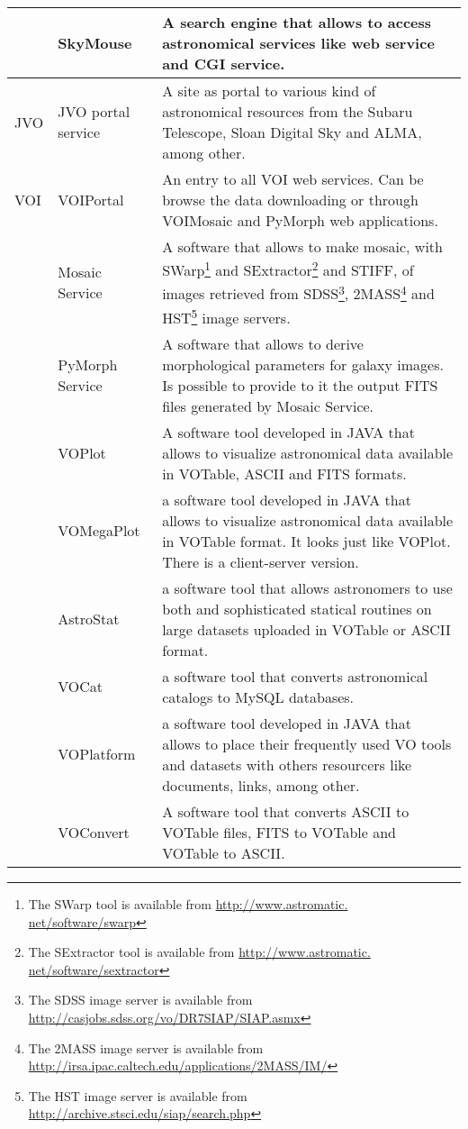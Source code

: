 \begin{table*}[h!t]
\begin{tabular}{|l|l|p{12.5cm}|}
			& SkyMouse & A search engine that allows to access astronomical services like web service and CGI service. \\
	\hline		
	JVO		& JVO portal service & A site as portal to various kind of astronomical resources from the Subaru Telescope, Sloan Digital Sky and ALMA, among 
									other. \\
	\hline								
	VOI		& VOIPortal & An entry to all VOI web services. Can be browse the data downloading or through VOIMosaic and PyMorph web applications.\\
			& Mosaic Service & A software that allows to make mosaic, with SWarp\footnote{The SWarp tool is available from \url{http://www.astromatic.
									net/software/swarp}} and SExtractor\footnote{The SExtractor tool is available from \url{http://www.astromatic.
									net/software/sextractor}} and STIFF, of images retrieved from SDSS\footnote{The SDSS image server is available from 
									\url{http://casjobs.sdss.org/vo/DR7SIAP/SIAP.asmx}}, 2MASS\footnote{The 2MASS image server is available from 
									\url{http://irsa.ipac.caltech.edu/applications/2MASS/IM/}} and HST\footnote{The HST image server is available from 
									\url{http://archive.stsci.edu/siap/search.php}} image servers.\\
			& PyMorph Service & A software that allows to derive morphological parameters for galaxy images. Is possible to provide to it the output FITS
									files generated by Mosaic Service.\\
			& VOPlot & A software tool developed in JAVA that allows to visualize astronomical data available in VOTable, ASCII and FITS formats.\\
			& VOMegaPlot & a software tool developed in JAVA that allows to visualize astronomical data available in VOTable format. It looks just like 
									VOPlot. There is a client-server version.\\
			& AstroStat & a software tool that allows astronomers to use both and sophisticated statical routines on large datasets uploaded in VOTable or
									ASCII format. \\
			& VOCat & a software tool that converts astronomical catalogs to MySQL databases. \\
			& VOPlatform& a software tool developed in JAVA that allows to place their frequently used VO tools and datasets with others resourcers like 
									documents, links, among other. \\
			& VOConvert & A software tool that converts ASCII to VOTable files, FITS to VOTable and VOTable to ASCII. \\

\end{tabular}
\end{table*}
